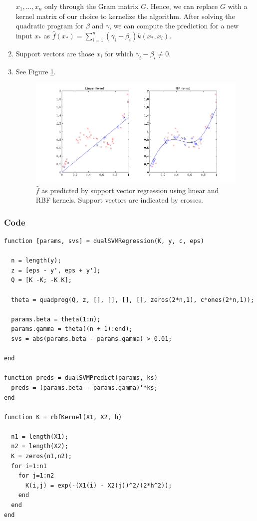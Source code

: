 \documentclass[11pt]{article}
\begin{document}
\begin{enumerate}
$x_1,\dots,x_n$ only through the Gram matrix $G$. Hence, we can replace $G$
with a kernel matrix of our choice to kernelize the algorithm. After solving
the quadratic program for $\beta$ and $\gamma$, we can compute the prediction
for a new input $x_*$ as
$\hat f(x_*) = \sum_{i = 1}^n (\gamma_i - \beta_i) k(x_*,x_i)$.
\item Support vectors are those $x_i$ for which $\gamma_i - \beta_i \neq 0$.
\item See Figure \ref{fig:1_1_4}.\vspace{-10mm}
\begin{figure}[h!]
\centering
\quad\;
\includegraphics[trim=22mm 5mm 21mm 4mm, clip=true, width=0.64\linewidth]{1_1_4}
\vspace{-6mm}
\caption{$\hat f$ as predicted by support vector regression using linear and
RBF kernels. Support vectors are indicated by crosses.}
\label{fig:1_1_4}
\end{figure}
\end{enumerate}
\subsubsection*{Code}
\begin{verbatim}
function [params, svs] = dualSVMRegression(K, y, c, eps)

  n = length(y);
  z = [eps - y', eps + y'];
  Q = [K -K; -K K];

  theta = quadprog(Q, z, [], [], [], [], zeros(2*n,1), c*ones(2*n,1));

  params.beta = theta(1:n);
  params.gamma = theta((n + 1):end);
  svs = abs(params.beta - params.gamma) > 0.01;

end

function preds = dualSVMPredict(params, ks)
  preds = (params.beta - params.gamma)'*ks;
end

function K = rbfKernel(X1, X2, h)

  n1 = length(X1);
  n2 = length(X2);
  K = zeros(n1,n2);
  for i=1:n1
    for j=1:n2
      K(i,j) = exp(-(X1(i) - X2(j))^2/(2*h^2));
    end
  end
end
\end{verbatim}
\newpage
\end{document}
